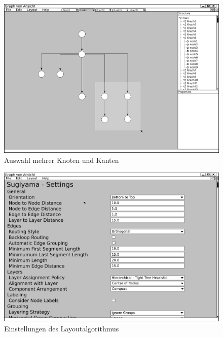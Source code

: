 \begin{figure}[ht]
  \centering
  \includegraphics[width=380pt]{resourcen/gui_view_drawSelection.png}
  \caption{Auswahl mehrer Knoten und Kanten}
  \label{fig:gui_view_drawSelection}
\end{figure}

\begin{figure}[ht]
  \centering
  \includegraphics[width=380pt]{resourcen/gui_layoutsettings_settings.png}
  \caption{Einstellungen des Layoutalgorithmus}
  \label{fig:gui_layoutsettings_settings}
\end{figure}

